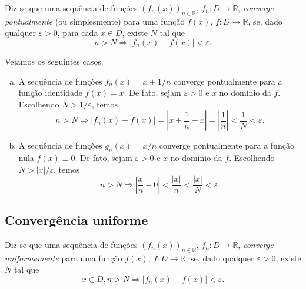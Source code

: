 \begin{defn}
  Diz-se que uma sequência de funções $(f_n(x))_{n\in\mathbb{R}}$, $f_n:D\to\mathbb{R}$, \emph{converge pontualmente} (ou simplesmente) para uma função $f(x)$, $f:D\to\mathbb{R}$, se, dado qualquer $\varepsilon>0$, para cada $x\in D$, existe $N$ tal que
  \begin{equation}
    n>N \Rightarrow |f_n(x)-f(x)|<\varepsilon.
  \end{equation}
\end{defn}

\begin{ex}\label{ex:convergência_pontual}
  Vejamos os seguintes casos.
  \begin{enumerate}[a)]
  \item A sequência de funções $f_n(x) = x + 1/n$ converge pontualmente para a função identidade $f(x)=x$. De fato, sejam $\varepsilon>0$ e $x$ no domínio da $f$. Escolhendo $N > 1/\varepsilon$, temos
    \begin{equation}
      n>N \Rightarrow |f_n(x) - f(x)| = \left|x+\frac{1}{n} - x\right| = \left|\frac{1}{n}\right| < \frac{1}{N} < \varepsilon.
    \end{equation}
  \item A sequência de funções $g_n(x) = x/n$ converge pontualmente para a função nula $f(x) \equiv 0$. De fato, sejam $\varepsilon>0$ e $x$ no domínio da $f$. Escolhendo $N > |x|/\varepsilon$, temos
    \begin{equation}
      n>N \Rightarrow \left|\frac{x}{n} - 0\right| < \frac{|x|}{n} < \frac{|x|}{N} < \varepsilon.
    \end{equation}
  \end{enumerate}
\end{ex}

\subsection{Convergência uniforme}

\begin{defn}
  Diz-se que uma sequência de funções $(f_n(x))_{n\in\mathbb{R}}$, $f_n:D\to\mathbb{R}$, \emph{converge uniformemente} para uma função $f(x)$, $f:D\to\mathbb{R}$, se, dado qualquer $\varepsilon>0$, existe $N$ tal que
  \begin{equation}
    x\in D, n>N \Rightarrow |f_n(x)-f(x)|<\varepsilon.
  \end{equation}
\end{defn}

